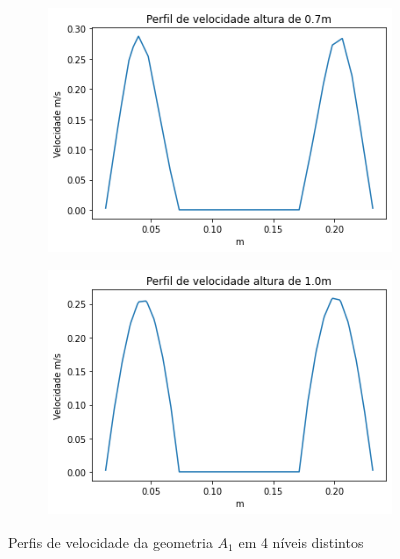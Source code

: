 \begin{figure}[H]
\begin{subfigure}[b]{0.42\linewidth}
    	\end{subfigure}
    	\\
    	\begin{subfigure}[b]{0.42\linewidth}
    		\includegraphics[width=\linewidth]{img/perfil_vel/liso/perfil_velocidade_liso_700.png}
    	\end{subfigure}
    	\begin{subfigure}[b]{0.42\linewidth}
    		\includegraphics[width=\linewidth]{img/perfil_vel/liso/perfil_velocidade_liso_1000.png}
    	\end{subfigure}
    	\caption{Perfis de velocidade da geometria $A_1$ em 4 níveis distintos}
    	\label{fig:perfil_velocidade_liso}
\end{figure}
    
